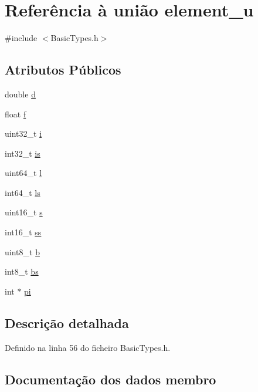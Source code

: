 \hypertarget{unionelement__u}{}\section{Referência à união element\+\_\+u}
\label{unionelement__u}


{\ttfamily \#include $<$Basic\+Types.\+h$>$}

\subsection*{Atributos Públicos}
\begin{DoxyCompactItemize}
\item 
double \hyperlink{unionelement__u_a055cfbd7f84724337a2cb16acdedab90}{d}
\item 
float \hyperlink{unionelement__u_ad3caae754d93e7fa606a0756f5ddc6a6}{f}
\item 
uint32\+\_\+t \hyperlink{unionelement__u_ac1564bf5b02b69382469449ba266dc9a}{i}
\item 
int32\+\_\+t \hyperlink{unionelement__u_a8230539b3b28f57ac3fd61e10c76a740}{is}
\item 
uint64\+\_\+t \hyperlink{unionelement__u_aca3c96df160bc775791470b98e15710f}{l}
\item 
int64\+\_\+t \hyperlink{unionelement__u_af52b13fa38bfc4e5a98d4b868324ee27}{ls}
\item 
uint16\+\_\+t \hyperlink{unionelement__u_a85c036f57770aeab7ed90947ffdfda53}{s}
\item 
int16\+\_\+t \hyperlink{unionelement__u_ab90ee55202fd11a2dc3cf48c74e55dab}{ss}
\item 
uint8\+\_\+t \hyperlink{unionelement__u_a53d82c8469f011fdb1e35f88738aaf5e}{b}
\item 
int8\+\_\+t \hyperlink{unionelement__u_ae2cf2a77222a37a817fba0e70266ddf6}{bs}
\item 
int $\ast$ \hyperlink{unionelement__u_a3c7acdaf4dc01ef8694967376100fc8f}{pi}
\end{DoxyCompactItemize}


\subsection{Descrição detalhada}


Definido na linha 56 do ficheiro Basic\+Types.\+h.



\subsection{Documentação dos dados membro}
\mbox{\label{unionelement__u_a53d82c8469f011fdb1e35f88738aaf5e}} 
